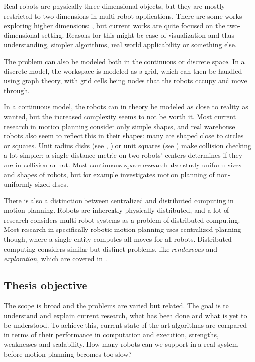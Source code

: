 Real robots are physically three-dimensional objects, but they are mostly restricted to two dimensions in multi-robot applications. 
There are some works exploring higher dimensions: \cite{arobots/TurpinMMK14}, but current works are quite focused on the two-dimensional setting. 
Reasons for this might be ease of visualization and thus understanding, simpler algorithms, real world applicability or something else.

The problem can also be modeled both in the continuous or discrete space. 
In a discrete model, the workspace is modeled as a grid, which can then be handled using graph theory, with grid cells being nodes that the robots occupy and move through.

In a continuous model, the robots can in theory be modeled as close to reality as wanted, but the increased complexity seems to not be worth it. 
Most current research in motion planning consider only simple shapes, and real warehouse robots also seem to reflect this in their shapes: many are shaped close to circles or squares. 
Unit radius disks (see \cite{siamcomp/DemaineFKMS19}, \cite{compgeom/BanyassadyBBBFH22}) or unit squares (see \cite{jea/YangV22}) make collision checking a lot simpler: a single distance metric on two robots' centers determines if they are in collision or not.
Most continuous space research also study uniform sizes and shapes of robots, but for example \cite{fun/BrockenHKLS21} investigates motion planning of non-uniformly-sized discs.


There is also a distinction between centralized and distributed computing in motion planning. 
Robots are inherently physically distributed, and a lot of research considers multi-robot systems as a problem of distributed computing.
Most research in specifically robotic motion planning uses centralized planning though, where a single entity computes all moves for all robots. 
Distributed computing considers similar but distinct problems, like \emph{rendezvous} and \emph{exploration}, which are covered in \cite{lncs/FlocchiniGN19}.






\subsection{Thesis objective}

The scope is broad and the problems are varied but related. 
The goal is to understand and explain current research, what has been done and what is yet to be understood. 
To achieve this, current state-of-the-art algorithms are compared in terms of their performance in computation and execution, strengths, weaknesses and scalability. 
How many robots can we support in a real system before motion planning becomes too slow? 
